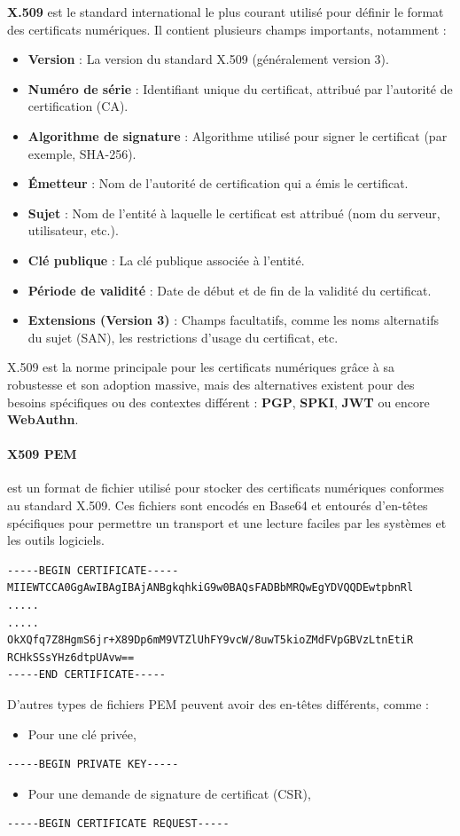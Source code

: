 \documentclass[french, 12pt]{article}%
\newcommand{\itemE}{\item[$\bullet$]}
\begin{document}
\textbf{X.509} est le standard international le plus courant utilisé pour définir le format des certificats numériques. Il contient plusieurs champs importants, notamment :
\begin{itemize}
\itemE \textbf{Version} : La version du standard X.509 (généralement version 3).
\itemE \textbf{Numéro de série} : Identifiant unique du certificat, attribué par l'autorité de certification (CA).
\itemE \textbf{Algorithme de signature} : Algorithme utilisé pour signer le certificat (par exemple, SHA-256).
\itemE \textbf{Émetteur} : Nom de l'autorité de certification qui a émis le certificat.
\itemE \textbf{Sujet} : Nom de l'entité à laquelle le certificat est attribué (nom du serveur, utilisateur, etc.).
\itemE \textbf{Clé publique} : La clé publique associée à l'entité.
\itemE \textbf{Période de validité} : Date de début et de fin de la validité du certificat.
\itemE \textbf{Extensions (Version 3)} : Champs facultatifs, comme les noms alternatifs du sujet (SAN), les restrictions d'usage du certificat, etc.

\end{itemize}

X.509 est la norme principale pour les certificats numériques grâce à sa robustesse et son adoption massive, mais des alternatives existent pour des besoins spécifiques ou des contextes différent : \textbf{PGP}, \textbf{SPKI}, \textbf{JWT} ou encore \textbf{WebAuthn}. 


\paragraph{X509 PEM} est un format de fichier utilisé pour stocker des certificats numériques conformes au standard X.509. Ces fichiers sont encodés en Base64 et entourés d'en-têtes spécifiques pour permettre un transport et une lecture faciles par les systèmes et les outils logiciels.


\begin{lstlisting}[style=commande]
-----BEGIN CERTIFICATE-----
MIIEWTCCA0GgAwIBAgIBAjANBgkqhkiG9w0BAQsFADBbMRQwEgYDVQQDEwtpbnRl
.....
.....
OkXQfq7Z8HgmS6jr+X89Dp6mM9VTZlUhFY9vcW/8uwT5kioZMdFVpGBVzLtnEtiR
RCHkSSsYHz6dtpUAvw==
-----END CERTIFICATE-----
\end{lstlisting}  

D'autres types de fichiers PEM peuvent avoir des en-têtes différents, comme :
\begin{itemize}
\itemE Pour une clé privée, 
\end{itemize} 
\begin{lstlisting}[style=commande]
-----BEGIN PRIVATE KEY-----
\end{lstlisting}
\begin{itemize}
\itemE Pour une demande de signature de certificat (CSR),
\end{itemize}
\begin{lstlisting}[style=commande]
-----BEGIN CERTIFICATE REQUEST-----
\end{lstlisting}
\end{document}
